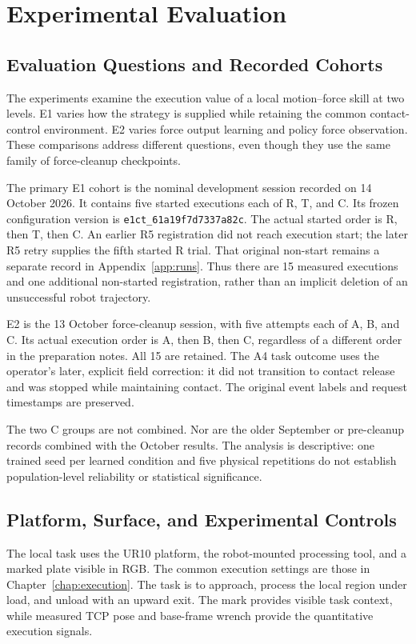 \chapter{Experimental Evaluation}
\label{chap:experiments}

\section{Evaluation Questions and Recorded Cohorts}
The experiments examine the execution value of a local motion--force skill at two levels. E1 varies how the strategy is supplied while retaining the common contact-control environment. E2 varies force output learning and policy force observation. These comparisons address different questions, even though they use the same family of force-cleanup checkpoints.

The primary E1 cohort is the nominal development session recorded on 14 October 2026. It contains five started executions each of R, T, and C. Its frozen configuration version is \texttt{e1ct\_61a19f7d7337a82c}. The actual started order is R, then T, then C. An earlier R5 registration did not reach execution start; the later R5 retry supplies the fifth started R trial. That original non-start remains a separate record in Appendix~\ref{app:runs}. Thus there are 15 measured executions and one additional non-started registration, rather than an implicit deletion of an unsuccessful robot trajectory.

E2 is the 13 October force-cleanup session, with five attempts each of A, B, and C. Its actual execution order is A, then B, then C, regardless of a different order in the preparation notes. All 15 are retained. The A4 task outcome uses the operator's later, explicit field correction: it did not transition to contact release and was stopped while maintaining contact. The original event labels and request timestamps are preserved.

The two C groups are not combined. Nor are the older September or pre-cleanup records combined with the October results. The analysis is descriptive: one trained seed per learned condition and five physical repetitions do not establish population-level reliability or statistical significance.

\section{Platform, Surface, and Experimental Controls}
The local task uses the UR10 platform, the robot-mounted processing tool, and a marked plate visible in RGB. The common execution settings are those in Chapter~\ref{chap:execution}. The task is to approach, process the local region under load, and unload with an upward exit. The mark provides visible task context, while measured TCP pose and base-frame wrench provide the quantitative execution signals.

